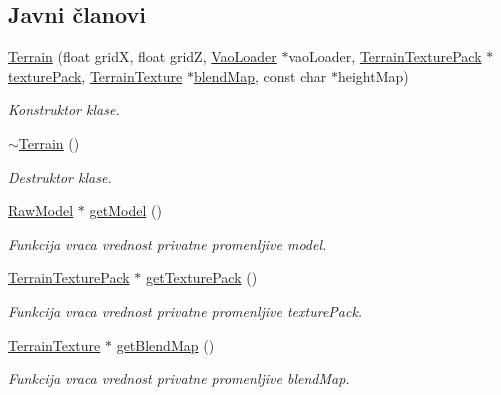 \subsection*{Javni članovi}
\begin{DoxyCompactItemize}
\item 
\hyperlink{classterrain_1_1Terrain_a3361d2b8405cb829d0b851a944bce94b}{Terrain} (float gridX, float gridZ, \hyperlink{classcore_1_1VaoLoader}{Vao\+Loader} $\ast$vao\+Loader, \hyperlink{classtexture_1_1TerrainTexturePack}{Terrain\+Texture\+Pack} $\ast$\hyperlink{classterrain_1_1Terrain_a6f9e86bd4c98ec61c9588b9f2b57fb75}{texture\+Pack}, \hyperlink{classtexture_1_1TerrainTexture}{Terrain\+Texture} $\ast$\hyperlink{classterrain_1_1Terrain_a48d20417020f61e62bb5d3a497c62a57}{blend\+Map}, const char $\ast$height\+Map)
\begin{DoxyCompactList}\small\item\em Konstruktor klase. \end{DoxyCompactList}\item 
\hyperlink{classterrain_1_1Terrain_a6aa3821700c2010298c1ad9f83971670}{$\sim$\+Terrain} ()
\begin{DoxyCompactList}\small\item\em Destruktor klase. \end{DoxyCompactList}\item 
\hyperlink{classmodel_1_1RawModel}{Raw\+Model} $\ast$ \hyperlink{classterrain_1_1Terrain_a336c5efe16ff0fd81c8b6b6f00b9ba08}{get\+Model} ()
\begin{DoxyCompactList}\small\item\em Funkcija vraca vrednost privatne promenljive model. \end{DoxyCompactList}\item 
\hyperlink{classtexture_1_1TerrainTexturePack}{Terrain\+Texture\+Pack} $\ast$ \hyperlink{classterrain_1_1Terrain_a6b6100654d9bb6f5f5ea004cc5bf95f4}{get\+Texture\+Pack} ()
\begin{DoxyCompactList}\small\item\em Funkcija vraca vrednost privatne promenljive texture\+Pack. \end{DoxyCompactList}\item 
\hyperlink{classtexture_1_1TerrainTexture}{Terrain\+Texture} $\ast$ \hyperlink{classterrain_1_1Terrain_ae4d64fa4f81168a02887127491572cef}{get\+Blend\+Map} ()
\begin{DoxyCompactList}\small\item\em Funkcija vraca vrednost privatne promenljive blend\+Map. \end{DoxyCompactList}\item 

\end{DoxyCompactItemize}
